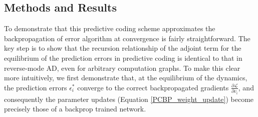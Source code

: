 \subsection{Methods and Results}

To demonstrate that this predictive coding scheme approximates the backpropagation of error algorithm at convergence is fairly straightforward. The key step is to show that the recursion relationship of the adjoint term for the equilibrium of the prediction errors in predictive coding is identical to that in reverse-mode AD, even for arbitrary computation graphs. To make this clear more intuitively, we first demonstrate that, at the equilibrium of the dynamics, the prediction errors $\epsilon^*_i$ converge to the correct backpropagated gradients $\frac{\partial \mathcal{L}}{\partial v_i}$, and consequently the parameter updates (Equation \ref{PCBP_weight_update}) become precisely those of a backprop trained network.

